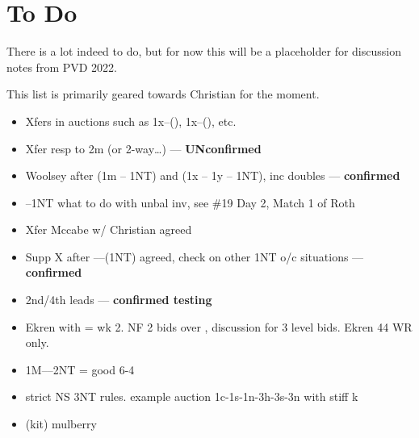 \documentclass[main]{subfile}
\begin{document}
	
	\chapter{To Do}
	
	There is a lot indeed to do, but for now this will be a placeholder for discussion notes from PVD 2022.
	
	This list is primarily geared towards Christian for the moment.
	
	\begin{itemize}
		\item Xfers in auctions such as 1x--(), 1x--(), etc.
		\item Xfer resp to 2m (or 2-way\ldots) --- \textbf{UNconfirmed}
		\item Woolsey after (1m -- 1NT) and (1x -- 1y -- 1NT), inc doubles  --- \textbf{confirmed}
		\item {}--1NT what to do with unbal inv, see \#19 Day 2, Match 1 of Roth
		\item Xfer Mccabe w/ Christian agreed
		\item Supp X after ----(1NT) agreed, check on other 1NT o/c situations --- \textbf{confirmed}
		\item 2nd/4th leads --- \textbf{confirmed testing}
		\item Ekren  with  = wk 2.  NF 2 bids over , discussion for 3 level bids. Ekren 44 WR only.
		\item 1M----2NT = good 6-4
		\item strict NS 3NT rules.  example auction 1c-1s-1n-3h-3s-3n with stiff k
		\item (kit) mulberry
	\end{itemize}
\end{document}
